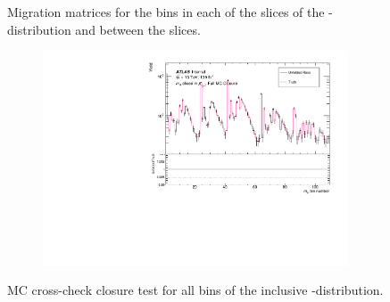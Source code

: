 \begin{figure}[htb]
\caption{Migration matrices for the \dPhill bins in each of the \mFourL slices of the \dPhill-\mFourL distribution and between the slices.\label{fig:dphimat}}
 \end{figure}

\FloatBarrier
\begin{figure}[htb]
  \centering
  \begin{subfigure}{.65\textwidth}\centering\includegraphics[width = 0.99\textwidth]{Figures/m4l/UnfoldingStudies/v014_closure/FullMCClosure_m4l_pt4l.pdf}\end{subfigure}
\caption{MC cross-check closure test for all bins of the inclusive \mFourL-\ptFourL distribution.\label{fig:pt4lclos}}
 \end{figure}

